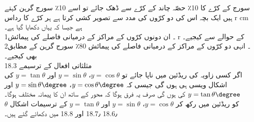سورج کے کرّے کا 10٪ حصّہ چاند کے کرّے سے ڈھک جائے تو اسے 10٪ سورج گرہن کہتے ہیں 
ایک بچہ اس کی دو کرّوں کی مدد سے تصویر کشی کرتا ہے ہر کرّے کا رداس r cm ہے جیسا کہ یہاں دکھایا گیا ہے۔\\
1۔ ان دونوں کرّوں کے مراکز کے درمیانی فاصلے کی پیمائش r کے حوالے سے کیجیے۔\\
2۔ انہی دو کرّوں کے مراکز کے درمیانی فاصلے کی پیمائش 80٪ سورج گرہن کے مطابق بھی کیجیے۔\\
18.3 مثلثاتی افعال کے ترسیمے\\
اگر کسی زاویہ کی ریڈئین میں ناپا جائے تو 
\(y=\cos\theta\)،
\(y=\sin\theta\)
اور
\(y=\tan\theta\)
کی اشکال ویسی ہی ہوں گی جیسی کہ 
\(y=\cos\theta\degree\)،
\(y=\sin\theta\degree\)
اور
\(y=\tan\theta\degree\)
کی ہوں گی صرف یہ فرق ہوگا کہ محور کے ساتھ ان کا پیمانہ مختلف ہوگا۔\\
\(\theta\)
کو ریڈئین میں رکھ کر 
\(y=\cos\theta\)،
\(y=\sin\theta\)
اور
\(y=\tan\theta\)
کے ترسیمات اشکال 18.6٫ 18.7٫ اور 18.8 میں دکھائے گئے ہیں۔\\


